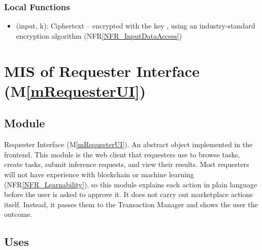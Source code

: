\documentclass[12pt, titlepage]{article}
\newcommand{\mref}[1]{M\ref{#1}}
\newcommand{\nfrref}[1]{NFR\ref{#1}}
\let\unbreakabletexttt\texttt
\renewcommand{\texttt}[1]{\unbreakabletexttt{\seqsplit{#1}}}
\begin{document}
\subsubsection{Local Functions}

\begin{itemize}
\item \texttt{encrypt}(input, k): Ciphertext -- \texttt{input} encrypted with
  the key \texttt{k}, using an industry-standard encryption algorithm
  (\nfrref{NFR_InputDataAccess})
\end{itemize}

\newpage

\section{MIS of Requester Interface (\mref{mRequesterUI})} \label{misRequesterUI}

\subsection{Module}

Requester Interface (\mref{mRequesterUI}). An abstract object implemented
in the \progname{} frontend. This module is the web client that
requesters use to browse tasks, create tasks, submit inference requests, and
view their results. Most requesters will not have experience
with blockchain or machine learning (\nfrref{NFR_Learnability}), so this module
explains each action in plain language before the user is asked to approve it.
It does not carry out marketplace actions itself. Instead, it passes them to
the Transaction Manager and shows the user the outcome.

\subsection{Uses}
\end{document}

